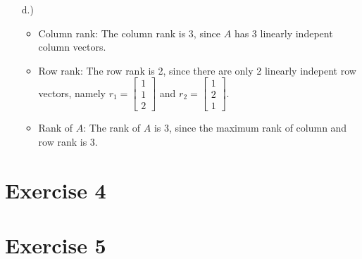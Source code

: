 \documentclass[%
   10pt,              %
   a4paper,           %
   DIV10,             %
]{scrartcl}%
\begin{document}
\begin{itemize}
	\item[d.)] \begin{itemize}
		\item Column rank: The column rank is 3, since $A$ has 3 linearly indepent column vectors.
		\item Row rank: The row rank is 2, since there are only 2 linearly indepent row vectors, namely $r_1 = \begin{bmatrix}
			1\\
			1\\
			2
		\end{bmatrix}$ and $r_2 = \begin{bmatrix}
		1\\
		2\\
		1
		\end{bmatrix}$.
		\item Rank of $A$: The rank of $A$ is 3, since the maximum rank of column and row rank is 3. 
	\end{itemize}
	
\end{itemize}


\section*{Exercise 4}
\section*{Exercise 5}
\end{document}
